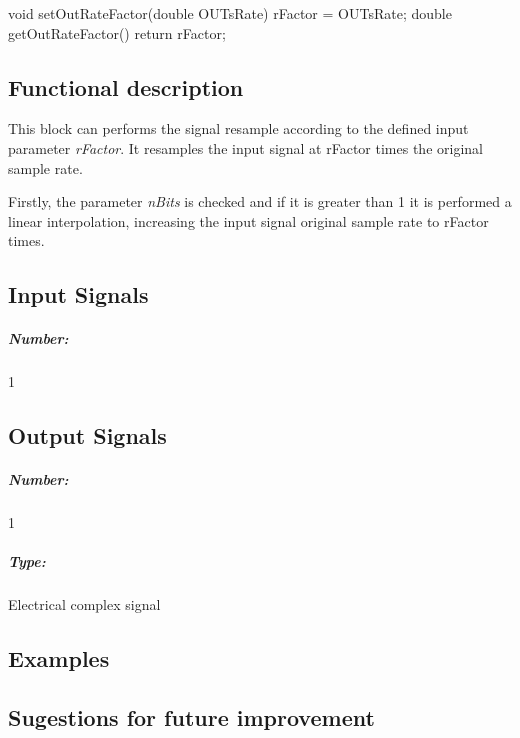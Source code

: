 void setOutRateFactor(double OUTsRate) { rFactor = OUTsRate; }
double getOutRateFactor() { return rFactor; }

\subsection*{Functional description}

This block can performs the signal resample according to the defined input parameter \textit{rFactor}. It resamples the input signal at rFactor times the original sample rate.

Firstly, the parameter \textit{nBits} is checked and if it is greater than 1 it is performed a linear interpolation, increasing the input signal original sample rate to rFactor times.


\pagebreak
\subsection*{Input Signals}

\subparagraph*{Number:} 1

\subsection*{Output Signals}

\subparagraph*{Number:} 1

\subparagraph*{Type:} Electrical complex signal

\subsection*{Examples}

\subsection*{Sugestions for future improvement}



